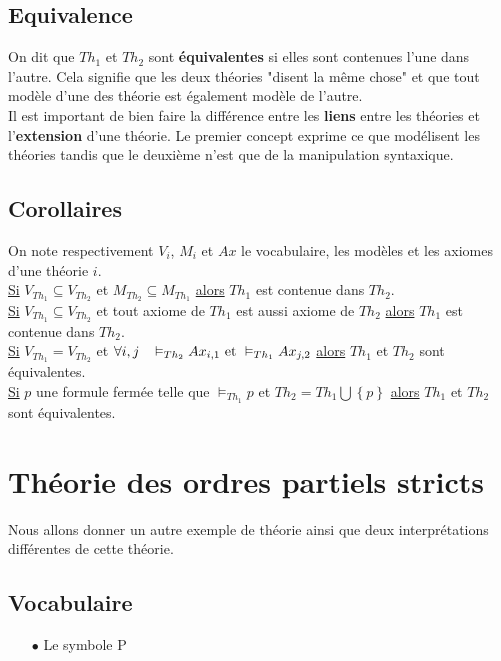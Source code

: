 \subsection*{Equivalence}
On dit que $Th_1$ et $Th_2$ sont \textbf{équivalentes} si elles sont contenues l'une dans l'autre. Cela signifie que les deux théories "disent la même chose" et que tout modèle d'une des théorie est également modèle de l'autre.\\

Il est important de bien faire la différence entre les \textbf{liens} entre les théories et l'\textbf{extension} d'une théorie. Le premier concept exprime ce que modélisent les théories tandis que le deuxième n'est que de la manipulation syntaxique.

\subsection*{Corollaires}
On note respectivement $V_i$, $M_i$ et $Ax$ le vocabulaire, les modèles et les axiomes d'une théorie $i$. \\

\noindent \underline{Si} $V_{Th_1} \subseteq V_{Th_2}$ et $M_{Th_2} \subseteq M_{Th_1}$ \underline{alors} $Th_1$ est contenue dans $Th_2$. \\

\noindent \underline{Si} $V_{Th_1} \subseteq V_{Th_2}$ et tout axiome de $Th_1$ est aussi axiome de $Th_2$ \underline{alors} $Th_1$ est contenue dans $Th_2$. \\

\noindent \underline{Si} $V_{Th_1} = V_{Th_2}$ et $\forall i,j \hspace{0.3cm} \vDash_{Th_2} Ax_{i,1} \textrm{ et } \vDash_{Th_1} Ax_{j,2} $ \underline{alors} $Th_1$ et $Th_2$ sont équivalentes. \\

\noindent \underline{Si} $p$ une formule fermée telle que $\vDash_{Th_1} p$ et $Th_2 = Th_1 \bigcup \left\lbrace p \right\rbrace$ \underline{alors} $Th_1$ et $Th_2$ sont équivalentes. \\

\section{Théorie des ordres partiels stricts}

Nous allons donner un autre exemple de théorie ainsi que deux interprétations différentes de cette théorie.
\subsection*{Vocabulaire}
\begin{itemize}
\item[$\bullet$] Le symbole P
\end{itemize}
